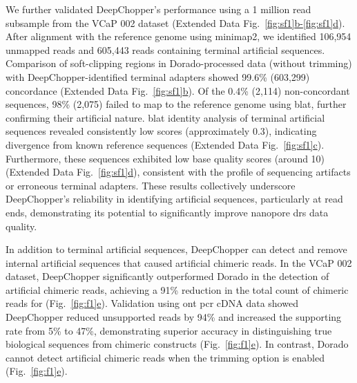 \documentclass[pdflatex,sn-nature, lineno]{sn-jnl}%
\newcommand{\figref}[2]{Fig.~\hyperref[#1]{\ref*{#1}#2}}
\newcommand{\edfigref}[2]{Extended Data Fig.~\hyperref[#1]{\ref*{#1}#2}}
\newcommand{\edfigrefrg}[3]{Extended Data Fig.~\hyperref[#1]{\ref*{#1}#2-\ref*{#1}#3}}
\theoremstyle{thmstyleone}%
\theoremstyle{thmstyletwo}%
\theoremstyle{thmstylethree}%
\begin{document}
We further validated DeepChopper's performance using a 1 million read subsample from the VCaP 002 dataset (\edfigrefrg{fig:sf1}{b}{d}). 
After alignment with the reference genome using minimap2\cite{li2018minimap2}, we identified 106,954 unmapped reads and 605,443 reads containing terminal artificial sequences.
Comparison of soft-clipping regions in Dorado-processed data (without trimming) with DeepChopper-identified terminal adapters showed 99.6\% (603,299) concordance (\edfigref{fig:sf1}{b}). 
Of the 0.4\% (2,114) non-concordant sequences, 98\% (2,075) failed to map to the reference genome using \gls{blat}, further confirming their artificial nature.
\gls{blat} identity analysis of terminal artificial sequences revealed consistently low scores (approximately 0.3), indicating divergence from known reference sequences (\edfigref{fig:sf1}{c}). 
Furthermore, these sequences exhibited low base quality scores (around 10) (\edfigref{fig:sf1}{d}), consistent with the profile of sequencing artifacts or erroneous terminal adapters.
These results collectively underscore DeepChopper's reliability in identifying artificial sequences, particularly at read ends, demonstrating its potential to significantly improve nanopore \gls{drs} data quality.

In addition to terminal artificial sequences, DeepChopper can detect and remove internal artificial sequences that caused artificial chimeric reads.
In the VCaP 002 dataset, DeepChopper significantly outperformed Dorado in the detection of artificial chimeric reads, achieving a 91\% reduction in the total count of chimeric reads for (\figref{fig:f1}{e}).
Validation using \gls{ont} \gls{pcr} cDNA data showed DeepChopper reduced unsupported reads by 94\% and increased the supporting rate from 5\% to 47\%, demonstrating superior accuracy in distinguishing true biological sequences from chimeric constructs (\figref{fig:f1}{e}).
In contrast, Dorado cannot detect artificial chimeric reads when the trimming option is enabled (\figref{fig:f1}{e}).
\end{document}
